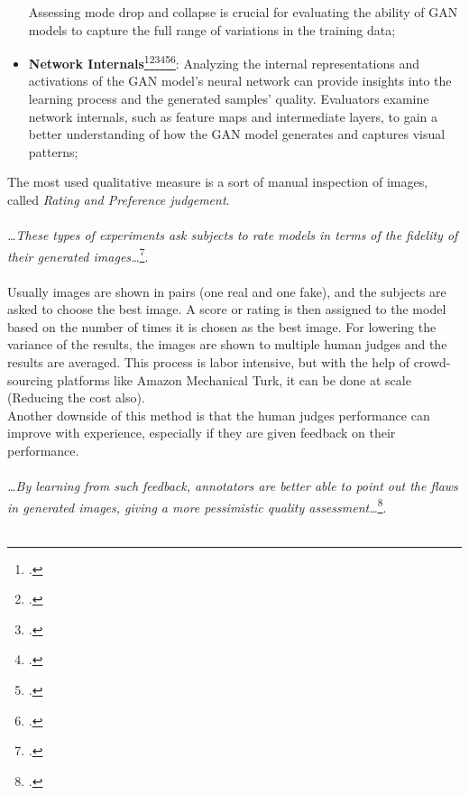 \begin{itemize}
    Assessing mode drop and collapse is crucial for evaluating the ability of GAN models to capture the full range of variations in the training data;
    \item \textbf{Network Internals}\footcite{paper:netint}\footcite{paper:netint1}\footcite{paper:netint2}\footcite{paper:netint3}\footcite{paper:netint4}\footcite{paper:netint5}: 
    Analyzing the internal representations and activations of the GAN model's neural network can provide insights into the learning process and the generated samples' quality. 
    Evaluators examine network internals, such as feature maps and intermediate layers, to gain a better understanding of how the GAN model generates and captures visual patterns;
\end{itemize}
The most used qualitative measure is a sort of manual inspection of images, called \emph{Rating and Preference judgement}.\\\\
\emph{\dots These types of experiments ask subjects to rate models in terms of the fidelity of their generated images\dots}\footcite{paper:ganeval}.\\\\
Usually images are shown in pairs (one real and one fake), and the subjects are asked to choose the best image.
A score or rating is then assigned to the model based on the number of times it is chosen as the best image.
For lowering the variance of the results, the images are shown to multiple human judges and the results are averaged.
This process is labor intensive, but with the help of crowd-sourcing platforms like Amazon Mechanical Turk, 
it can be done at scale (Reducing the cost also).\\
Another downside of this method is that the human judges performance can improve with experience, especially if they are given feedback on their performance.\\\\
\emph{\dots By learning from such feedback, annotators are better able to point out the flaws in generated images, giving a more pessimistic quality assessment\dots}\footcite{paper:ganeval}.\\\\
